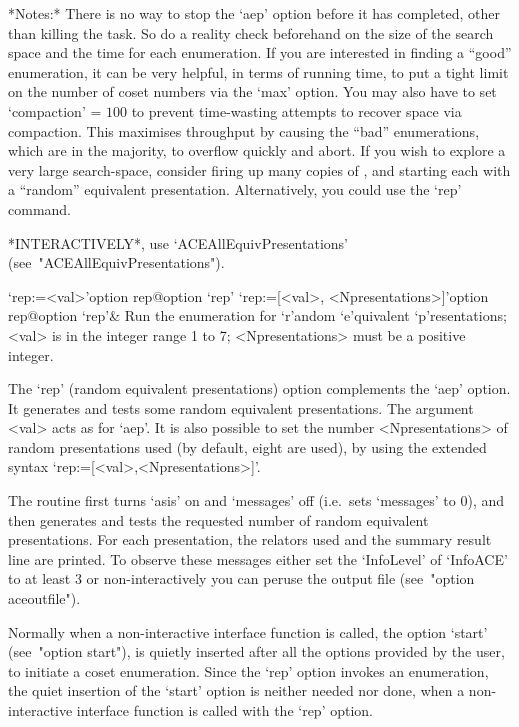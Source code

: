 *Notes:*
There is no way to stop the `aep'  option  before  it  has  completed,
other than killing the task. So do a reality check beforehand  on  the
size of the search space and the time for each enumeration. If you are
interested in finding a ``good'' enumeration, it can be very  helpful,
in terms of running time, to put a tight limit on the number of  coset
numbers via the `max' option. You may also have to set `compaction'  =
$100$  to  prevent  time-wasting  attempts  to   recover   space   via
compaction.  This  maximises  throughput  by   causing   the   ``bad''
enumerations, which are in  the  majority,  to  overflow  quickly  and
abort. If you wish to explore  a  very  large  search-space,  consider
firing up many copies of {\ACE}, and starting each with  a  ``random''
equivalent  presentation.  Alternatively,  you  could  use  the  `rep'
command.

*INTERACTIVELY*,            use             `ACEAllEquivPresentations'
(see~"ACEAllEquivPresentations").

\>`rep:=<val>'{option rep}@{option `rep'}
\>`rep:=[<val>, <Npresentations>]'{option rep}@{option `rep'}&
Run the enumeration for `r'andom `e'quivalent `p'resentations;
<val> is in the integer range 1 to 7;
<Npresentations> must be a positive integer.

The `rep' (random equivalent  presentations)  option  complements  the
`aep'  option.  It  generates  and  tests   some   random   equivalent
presentations. The argument <val>  acts  as  for  `aep'.  It  is  also
possible to set the number <Npresentations>  of  random  presentations
used (by default, eight  are  used),  by  using  the  extended  syntax
`rep:=[<val>,<Npresentations>]'.

The routine first  turns  `asis'  on  and  `messages'  off  (i.e.~sets
`messages' to 0), and then generates and tests the requested number of
random equivalent presentations. For each presentation,  the  relators
used and the  summary  result  line  are  printed.  To  observe  these
messages either set the `InfoLevel' of `InfoACE'  to  at  least  3  or
non-interactively you can peruse the {\ACE} output  file  (see~"option
aceoutfile").

Normally when a non-interactive {\ACE} interface function  is  called,
the option `start' (see~"option start"), is quietly inserted after all
the options provided by the user, to  initiate  a  coset  enumeration.
Since the `rep' option invokes an enumeration, the quiet insertion  of
the `start' option is neither needed nor done, when a  non-interactive
{\ACE} interface function is called with the `rep' option.

